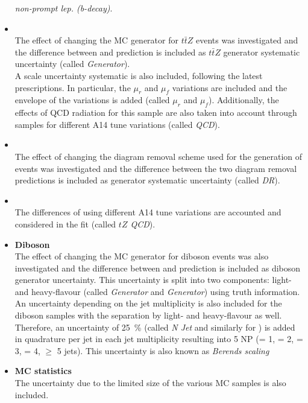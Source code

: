\begin{itemize}
	\textit{\ttbar non-prompt lep. (b-decay)}. \\
	\item \textbf{\ttZ} \\
	The effect of changing the MC generator for $t\bar{t}Z$ events was
	investigated and the difference between \aMCatNLO and \Sherpa
	prediction is included as $t\bar{t}Z$ generator systematic
	uncertainty (called \textit{\ttZ Generator}). \\
	A scale uncertainty systematic is also included, following the
	latest prescriptions. In particular, the $\mu_r$ and $\mu_f$
	variations are included and the envelope of the variations is added 
	(called \textit{\ttZ $\mu_r$} and \textit{$\mu_f$}).
	Additionally, the effects of QCD radiation for this
	sample are also taken into account through samples for different A14
	tune variations (called \textit{\ttZ QCD}).\\
	\item \textbf{\tWZ} \\
	The effect of changing the diagram removal scheme used for the generation of \tWZ events was
	investigated and the difference between the two diagram removal
	predictions is included as \tWZ generator systematic uncertainty
	(called \textit{\tWZ DR}).\\
	\item \textbf{\tZq} \\
	The differences of using different A14
	tune variations are accounted and considered in the fit (called
	\textit{$tZ$ QCD}).\\
	\item \textbf{Diboson} \\
	The effect of changing the MC generator for diboson events was also
	investigated and the difference between \Sherpa and \PowhegBox
	prediction is included as diboson generator uncertainty. This
	uncertainty is split into two components: light- and heavy-flavour
	(called \textit{\VVLF Generator} and \textit{\VVHF Generator}) using truth information. \\
	An uncertainty depending on the jet multiplicity is also included for
	the diboson samples with the separation by light- and heavy-flavour as
	well. Therefore, an uncertainty of \SI{25}{\%} 
	(called \textit{\VVLF N Jet} and similarly for \VVHF) is added in quadrature
	per jet in each jet multiplicity resulting into 
	5 NP (= 1, = 2, = 3, = 4, $\geq$ 5 jets). This uncertainty is also known as \textit{Berends scaling} \\ 
	\item \textbf{MC statistics} \\ 
	The uncertainty due to the limited size of the various MC samples is also included.\\
\end{itemize}

